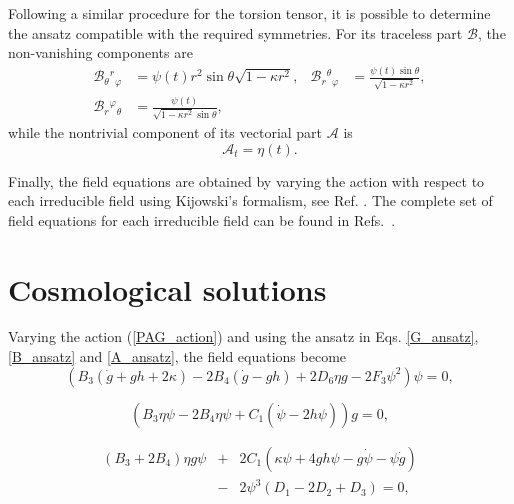 \documentclass[epj]{svjour}
\providecommand{\B}[3]{\mathcal{B}_{#1}{}^{#2}{}_{#3}}
\providecommand{\A}[1]{\mathcal{A}_{#1}}
\begin{document}
Following a similar procedure for the torsion tensor, it is possible to determine the ansatz compatible with 
the required symmetries. For its traceless part $\mathcal{B}$, the non-vanishing components are
\begin{equation}
\label{B_ansatz}
\begin{aligned}
    \B{\theta}{r}{\varphi} & = \psi (t) r^2\sin\theta \sqrt{1 - \kappa r^2}, &
    \B{r}{\theta}{\varphi} & =\frac{\psi (t) \sin \theta}{\sqrt{1 - \kappa r^2}}, \\
    \B{r}{\varphi}{\theta} & =\frac{\psi(t)}{ \sqrt{1-\kappa r^{2}} \sin \theta},
\end{aligned}
\end{equation}
while the nontrivial component of its vectorial part $\mathcal{A}$ is
\begin{equation}
    \label{A_ansatz}
    \A{t} = \eta(t).
\end{equation}

Finally, the field equations are obtained by varying the action with respect to each irreducible field using Kijowski's 
formalism, see Ref. \cite{KJ_Formalism,Castillo_Felisola_2020}. The complete  set of field equations for each irreducible field can be found in Refs.~\cite{Castillo_Felisola_2020,Castillo-Felisola_2023}.

\section{Cosmological solutions}
\label{sec:solutions}
Varying the action (\ref{PAG_action}) and using the ansatz in Eqs. \eqref{G_ansatz}, \eqref{B_ansatz} and \eqref{A_ansatz}, the field equations become
\begin{equation}
    \label{Feq_1}
    \left(B_3\left(\dot{g} + gh + 2\kappa\right) - 2B_4\left(\dot{g} - gh\right) + 2D_6\eta g - 2F_3\psi^2\right)\psi = 0,
\end{equation}

\begin{equation}
    \label{Feq_2}
    (B_3\eta\psi -2B_4\eta\psi + C_1(\dot{\psi} - 2h\psi))g = 0,
\end{equation}

\begin{eqnarray}
    \label{Feq_3}
    \left(B_3 + 2B_4\right)\eta g\psi &+& 2C_1(\kappa\psi + 4gh\psi - g\dot{\psi} - \psi\dot{g}) \nonumber \\ &-& 2\psi^3(D_1 - 2D_2 + D_3) = 0,
\end{eqnarray}
\end{document}
